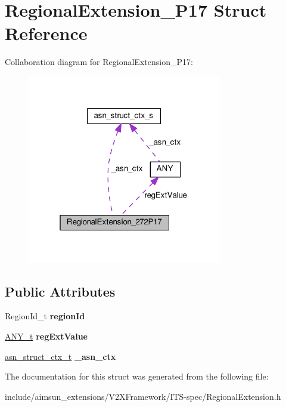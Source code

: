 \hypertarget{structRegionalExtension__272P17}{}\section{Regional\+Extension\+\_\+P17 Struct Reference}
\label{structRegionalExtension__272P17}


Collaboration diagram for Regional\+Extension\+\_\+P17\+:\nopagebreak
\begin{figure}[H]
\begin{center}
\leavevmode
\includegraphics[width=241pt]{structRegionalExtension__272P17__coll__graph}
\end{center}
\end{figure}
\subsection*{Public Attributes}
\begin{DoxyCompactItemize}
\item 
Region\+Id\+\_\+t {\bfseries region\+Id}\hypertarget{structRegionalExtension__272P17_add1a3bcb4a4a585ed2ef2dd9606f48e7}{}\label{structRegionalExtension__272P17_add1a3bcb4a4a585ed2ef2dd9606f48e7}

\item 
\hyperlink{structANY}{A\+N\+Y\+\_\+t} {\bfseries reg\+Ext\+Value}\hypertarget{structRegionalExtension__272P17_a469768e57c8b101dc1b9e2b89a32c85b}{}\label{structRegionalExtension__272P17_a469768e57c8b101dc1b9e2b89a32c85b}

\item 
\hyperlink{structasn__struct__ctx__s}{asn\+\_\+struct\+\_\+ctx\+\_\+t} {\bfseries \+\_\+asn\+\_\+ctx}\hypertarget{structRegionalExtension__272P17_a96e2c376c288a27bd507c8f25bf8cd3b}{}\label{structRegionalExtension__272P17_a96e2c376c288a27bd507c8f25bf8cd3b}

\end{DoxyCompactItemize}


The documentation for this struct was generated from the following file\+:\begin{DoxyCompactItemize}
\item 
include/aimsun\+\_\+extensions/\+V2\+X\+Framework/\+I\+T\+S-\/spec/Regional\+Extension.\+h\end{DoxyCompactItemize}
